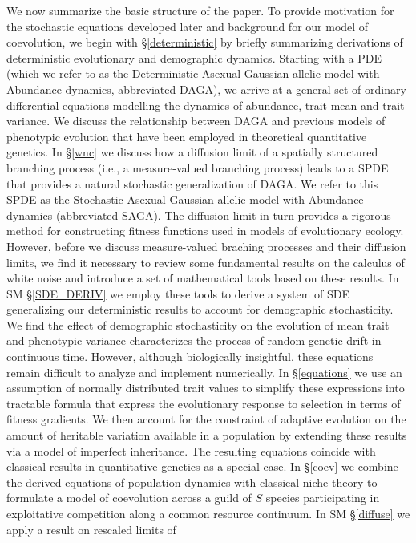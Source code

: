 \documentclass[]{elsarticle} %
\begin{document}
We now summarize the basic structure of the paper. To provide motivation
for the stochastic equations developed later and background for our
model of coevolution, we begin with \S\ref{deterministic} by briefly
summarizing derivations of deterministic evolutionary and demographic
dynamics. Starting with a PDE (which we refer to as the Deterministic
Asexual Gaussian allelic model with Abundance dynamics, abbreviated
DAGA), we arrive at a general set of ordinary differential equations
modelling the dynamics of abundance, trait mean and trait variance. We
discuss the relationship between DAGA and previous models of phenotypic
evolution that have been employed in theoretical quantitative genetics.
In \S\ref{wnc} we discuss how a diffusion limit of a spatially
structured branching process (i.e., a measure-valued branching process)
leads to a SPDE that provides a natural stochastic generalization of
DAGA. We refer to this SPDE as the Stochastic Asexual Gaussian allelic
model with Abundance dynamics (abbreviated SAGA). The diffusion limit in
turn provides a rigorous method for constructing fitness functions used
in models of evolutionary ecology. However, before we discuss
measure-valued braching processes and their diffusion limits, we find it
necessary to review some fundamental results on the calculus of white
noise and introduce a set of mathematical tools based on these results.
In SM \S\ref{SDE_DERIV} we employ these tools to derive a system of SDE
generalizing our deterministic results to account for demographic
stochasticity. We find the effect of demographic stochasticity on the
evolution of mean trait and phenotypic variance characterizes the
process of random genetic drift in continuous time. However, although
biologically insightful, these equations remain difficult to analyze and
implement numerically. In \S\ref{equations} we use an assumption of
normally distributed trait values to simplify these expressions into
tractable formula that express the evolutionary response to selection in
terms of fitness gradients. We then account for the constraint of
adaptive evolution on the amount of heritable variation available in a
population by extending these results via a model of imperfect
inheritance. The resulting equations coincide with classical results in
quantitative genetics as a special case. In \S\ref{coev} we combine the
derived equations of population dynamics with classical niche theory to
formulate a model of coevolution across a guild of \(S\) species
participating in exploitative competition along a common resource
continuum. In SM \S\ref{diffuse} we apply a result on rescaled limits of
\end{document}
